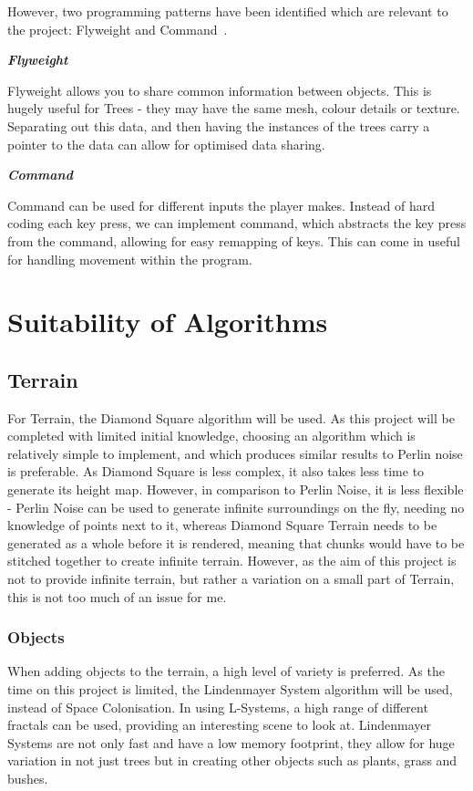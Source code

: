 \documentclass[a4paper,10pt]{report}
\begin{document}
However, two programming patterns have been identified which are relevant to the project: Flyweight and Command~\cite{nystrom2014game}.\medskip

\emph{\textbf{Flyweight}}\medskip

Flyweight allows you to share common information between objects. This is hugely useful for Trees - they may have the same mesh, colour details or texture. Separating out this data, and then having the instances of the trees carry a pointer to the data can allow for optimised data sharing. \medskip

\emph{\textbf{Command}}\medskip

Command can be used for different inputs the player makes. Instead of hard coding each key press, we can implement command, which abstracts the key press from the command, allowing for easy remapping of keys. This can come in useful for handling movement within the program. 

\section{Suitability of Algorithms}

\subsection{Terrain}

For Terrain, the Diamond Square algorithm will be used. As this project will be completed with limited initial knowledge, choosing an algorithm which is relatively simple to implement, and which produces similar results to Perlin noise is preferable. As Diamond Square is less complex, it also takes less time to generate its height map. However, in comparison to Perlin Noise, it is less flexible - Perlin Noise can be used to generate infinite surroundings on the fly, needing no knowledge of points next to it, whereas Diamond Square Terrain needs to be generated as a whole before it is rendered, meaning that chunks would have to be stitched together to create infinite terrain. However, as the aim of this project is not to provide infinite terrain, but rather a variation on a small part of Terrain, this is not too much of an issue for me. 

\subsubsection{Objects}

When adding objects to the terrain, a high level of variety is preferred. As the time on this project is limited, the Lindenmayer System algorithm will be used, instead of Space Colonisation. In using L-Systems, a high range of different fractals can be used, providing an interesting scene to look at. Lindenmayer Systems are not only fast and have a low memory footprint, they allow for huge variation in not just trees but in creating other objects such as plants, grass and bushes. 
\end{document}
